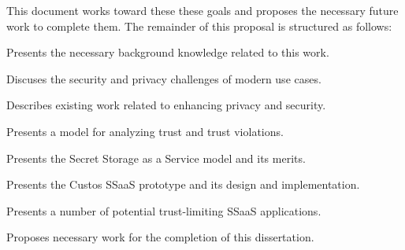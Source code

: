 This document works toward these these goals and proposes the
necessary future work to complete them. The remainder of this proposal
is structured as follows:

\begin{packed_desc}
\item[Chapter~\ref{chap:background} - Background:] Presents the
  necessary background knowledge related to this work.
\item[Chapter~\ref{chap:challenges} - Challenges:] Discuses the
  security and privacy challenges of modern use cases.
\item[Chapter~\ref{chap:related} - Related Work:] Describes existing
  work related to enhancing privacy and security.
\item[Chapter~\ref{chap:trust} - Trust Model:] Presents a model for
  analyzing trust and trust violations.
\item[Chapter~\ref{chap:ssaas} - SSaaS:] Presents the Secret Storage
  as a Service model and its merits.
\item[Chapter~\ref{chap:custos} - Custos:] Presents the Custos SSaaS
  prototype and its design and implementation.
\item[Chapter~\ref{chap:apps} - Applications:] Presents a number of
  potential trust-limiting SSaaS applications.
\item[Chapter~\ref{chap:planned} - Proposed Work:] Proposes necessary
  work for the completion of this dissertation.
\end{packed_desc}

